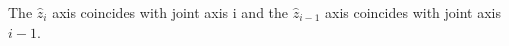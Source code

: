 \documentclass[preview]{standalone}
\begin{document}
\begin{center}
The $\hat{z}_i$ axis coincides with joint axis i and the $\hat{z}_{i-1}$ axis coincides with joint axis $i-1$.
\end{center}
\end{document}
